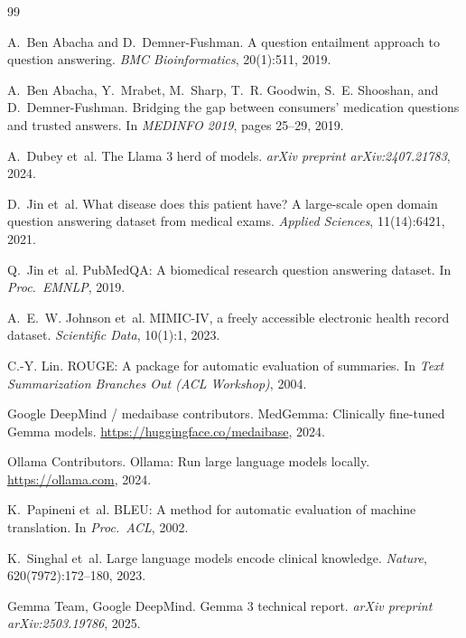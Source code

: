 \documentclass[10pt,letterpaper]{article}
\begin{document}
\begin{thebibliography}{99}

A.~Ben Abacha and D.~Demner-Fushman.
\newblock A question entailment approach to question answering.
\newblock \emph{BMC Bioinformatics}, 20(1):511, 2019.

A.~Ben Abacha, Y.~Mrabet, M.~Sharp, T.~R. Goodwin, S.~E. Shooshan, and
D.~Demner-Fushman.
\newblock Bridging the gap between consumers' medication questions and trusted
answers.
\newblock In \emph{MEDINFO 2019}, pages 25--29, 2019.

A.~Dubey et~al.
\newblock The Llama 3 herd of models.
\newblock \emph{arXiv preprint arXiv:2407.21783}, 2024.

D.~Jin et~al.
\newblock What disease does this patient have? A large-scale open domain
question answering dataset from medical exams.
\newblock \emph{Applied Sciences}, 11(14):6421, 2021.

Q.~Jin et~al.
\newblock PubMedQA: A biomedical research question answering dataset.
\newblock In \emph{Proc.\ EMNLP}, 2019.

A.~E.~W. Johnson et~al.
\newblock MIMIC-IV, a freely accessible electronic health record dataset.
\newblock \emph{Scientific Data}, 10(1):1, 2023.

C.-Y. Lin.
\newblock ROUGE: A package for automatic evaluation of summaries.
\newblock In \emph{Text Summarization Branches Out (ACL Workshop)}, 2004.

{Google DeepMind / medaibase contributors}.
\newblock MedGemma: Clinically fine-tuned Gemma models.
\newblock \url{https://huggingface.co/medaibase}, 2024.

{Ollama Contributors}.
\newblock Ollama: Run large language models locally.
\newblock \url{https://ollama.com}, 2024.

K.~Papineni et~al.
\newblock BLEU: A method for automatic evaluation of machine translation.
\newblock In \emph{Proc.\ ACL}, 2002.

K.~Singhal et~al.
\newblock Large language models encode clinical knowledge.
\newblock \emph{Nature}, 620(7972):172--180, 2023.

{Gemma Team, Google DeepMind}.
\newblock Gemma 3 technical report.
\newblock \emph{arXiv preprint arXiv:2503.19786}, 2025.


\end{thebibliography}
\end{document}
